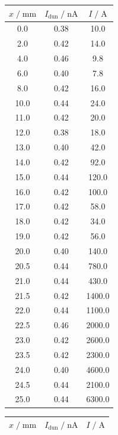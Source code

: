\begin{table}
    \centering
    \begin{tabular}[t]{ccc|}
    \toprule
    $x\;/\; \si{\milli\meter}$ & $I_\text{dun}\;/\;\si{\nano\A}$ & $I \;/\; \si{\A}$\\
    \midrule
    0.0 & 0.38 & 10.0       \\
    2.0 & 0.42 & 14.0       \\
    4.0 & 0.46 & 9.8        \\
    6.0 & 0.40 & 7.8        \\
    8.0 & 0.42 & 16.0       \\
    10.0 & 0.44 & 24.0      \\
    11.0 & 0.42 & 20.0      \\
    12.0 & 0.38 & 18.0      \\
    13.0 & 0.40 & 42.0      \\
    14.0 & 0.42 & 92.0      \\
    15.0 & 0.44 & 120.0     \\
    16.0 & 0.42 & 100.0     \\
    17.0 & 0.42 & 58.0      \\
    18.0 & 0.42 & 34.0      \\
    19.0 & 0.42 & 56.0      \\
    20.0 & 0.40 & 140.0     \\
    20.5 & 0.44 & 780.0     \\
    21.0 & 0.44 & 430.0     \\
    21.5 & 0.42 & 1400.0    \\
    22.0 & 0.44 & 1100.0    \\
    22.5 & 0.46 & 2000.0    \\
    23.0 & 0.42 & 2600.0    \\
    23.5 & 0.42 & 2300.0    \\
    24.0 & 0.40 & 4600.0    \\
    24.5 & 0.44 & 2100.0    \\
    25.0 & 0.44 & 6300.0    \\
    \bottomrule
    \end{tabular}
    \begin{tabular}[t]{|ccc}
    \toprule
    $x\;/\; \si{\milli\meter}$ & $I_\text{dun}\;/\;\si{\nano\A}$ & $I \;/\; \si{\A}$\\
    \midrule


\end{tabular}
\end{table}
